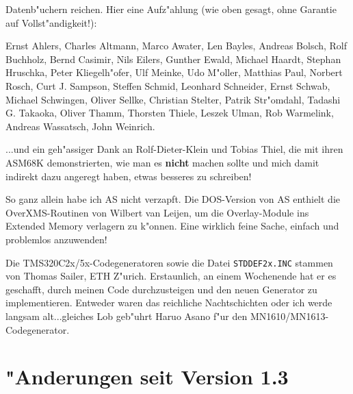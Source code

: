 \documentclass[12pt,a4paper,twoside]{report}
\newcommand{\bb}[1]{{\bf #1}}
\newcommand{\tty}[1]{{\tt #1}}
\begin{document}
Datenb"uchern reichen.  Hier eine Aufz"ahlung (wie oben gesagt, ohne
Garantie auf Vollst"andigkeit!):
\par
Ernst Ahlers, Charles Altmann, Marco Awater, Len Bayles,
Andreas Bolsch, Rolf Buchholz, Bernd Casimir, Nils Eilers,
Gunther Ewald, Michael Haardt, Stephan Hruschka, Peter Kliegelh"ofer,
Ulf Meinke, Udo M"oller, Matthias Paul, Norbert Rosch, Curt J. Sampson,
Steffen Schmid, Leonhard Schneider, Ernst Schwab, Michael Schwingen,
Oliver Sellke, Christian Stelter, Patrik Str"omdahl,
Tadashi G. Takaoka, Oliver Thamm, Thorsten Thiele, Leszek Ulman,
Rob Warmelink, Andreas Wassatsch, John Weinrich.
\par
...und ein geh"assiger Dank an Rolf-Dieter-Klein und Tobias Thiel, die
mit ihren ASM68K demonstrierten, wie man es \bb{nicht} machen sollte und
mich damit indirekt dazu angeregt haben, etwas besseres zu schreiben!
\par
So ganz allein habe ich AS nicht verzapft.  Die DOS-Version von AS enthielt
die OverXMS-Routinen von Wilbert van Leijen, um die Overlay-Module ins
Extended Memory verlagern zu k"onnen.  Eine wirklich feine Sache,
einfach und problemlos anzuwenden!
\par
Die TMS320C2x/5x-Codegeneratoren sowie die Datei \tty{STDDEF2x.INC}
stammen von Thomas Sailer, ETH Z"urich.  Erstaunlich, an einem Wochenende
hat er es geschafft, durch meinen Code durchzusteigen und den neuen
Generator zu implementieren.  Entweder waren das reichliche Nachtschichten
oder ich werde langsam alt...gleiches Lob geb"uhrt Haruo Asano f"ur den
MN1610/MN1613-Codegenerator.


\cleardoublepage
\chapter{"Anderungen seit Version 1.3}
\end{document}
